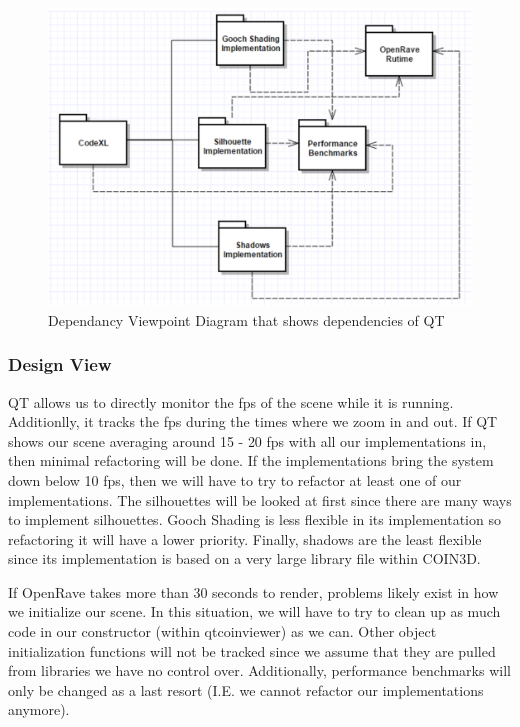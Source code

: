 \documentclass[10pt,journal,compsoc,draftclsnofoot]{IEEEtran}
\begin{document}
\begin{flushleft}
\begin{figure} [H]
  \includegraphics[scale=0.9]{CodeXL_Dependency.eps}
  \caption
{ \newline \hspace{\linewidth}
Dependancy Viewpoint Diagram that shows dependencies of QT}
  \label{fig:CodeXL_Dependency}
\end{figure}

\subsubsection{Design View}
QT allows us to directly monitor the fps of the scene while it is running.
Additionlly, it tracks the fps during the times where we zoom in and out.
If QT shows our scene averaging around 15 - 20 fps with all our implementations in, then minimal refactoring will be done.
If the implementations bring the system down below 10 fps, then we will have to try to refactor at least one of our implementations.
The silhouettes will be looked at first since there are many ways to implement silhouettes. 
Gooch Shading is less flexible in its implementation so refactoring it will have a lower priority.
Finally, shadows are the least flexible since its implementation is based on a very large library file within COIN3D.

If OpenRave takes more than 30 seconds to render, problems likely exist in how we initialize our scene.
In this situation, we will have to try to clean up as much code in our constructor (within qtcoinviewer) as we can.
Other object initialization functions will not be tracked since we assume that they are pulled from libraries we have no control over.
Additionally, performance benchmarks will only be changed as a last resort (I.E. we cannot refactor our implementations anymore).


\end{flushleft}
\end{document}
